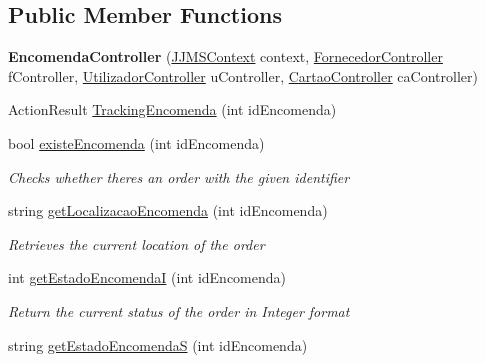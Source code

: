 \subsection*{Public Member Functions}
\begin{DoxyCompactItemize}
\item 
\mbox{\label{classmvc_j_j_m_s_1_1_controllers_1_1_encomenda_controller_a23ae8934385ef0e18316920583381eb2}} 
{\bfseries Encomenda\+Controller} (\mbox{\hyperlink{classmvc_j_j_m_s_1_1_data_1_1_j_j_m_s_context}{J\+J\+M\+S\+Context}} context, \mbox{\hyperlink{classmvc_j_j_m_s_1_1_controllers_1_1_fornecedor_controller}{Fornecedor\+Controller}} f\+Controller, \mbox{\hyperlink{classmvc_j_j_m_s_1_1_controllers_1_1_utilizador_controller}{Utilizador\+Controller}} u\+Controller, \mbox{\hyperlink{classmvc_j_j_m_s_1_1_controllers_1_1_cartao_controller}{Cartao\+Controller}} ca\+Controller)
\item 
Action\+Result \mbox{\hyperlink{classmvc_j_j_m_s_1_1_controllers_1_1_encomenda_controller_a4394d01a5090ea7711fc97a9d7478581}{Tracking\+Encomenda}} (int id\+Encomenda)
\item 
bool \mbox{\hyperlink{classmvc_j_j_m_s_1_1_controllers_1_1_encomenda_controller_a52ed51732bae82bd099506519656170b}{existe\+Encomenda}} (int id\+Encomenda)
\begin{DoxyCompactList}\small\item\em Checks whether there\textquotesingle{}s an order with the given identifier \end{DoxyCompactList}\item 
string \mbox{\hyperlink{classmvc_j_j_m_s_1_1_controllers_1_1_encomenda_controller_a76a4a0b0f36cb8d70f3342b601e5d8bb}{get\+Localizacao\+Encomenda}} (int id\+Encomenda)
\begin{DoxyCompactList}\small\item\em Retrieves the current location of the order \end{DoxyCompactList}\item 
int \mbox{\hyperlink{classmvc_j_j_m_s_1_1_controllers_1_1_encomenda_controller_a650422f9822c10979a38f9b7de902146}{get\+Estado\+EncomendaI}} (int id\+Encomenda)
\begin{DoxyCompactList}\small\item\em Return the current status of the order in Integer format \end{DoxyCompactList}\item 
string \mbox{\hyperlink{classmvc_j_j_m_s_1_1_controllers_1_1_encomenda_controller_a9a1c47299b334b34c9df35dd4f644184}{get\+Estado\+EncomendaS}} (int id\+Encomenda)

\end{DoxyCompactItemize}

